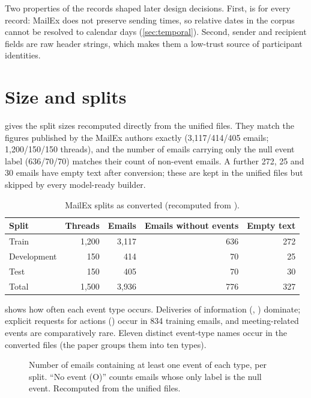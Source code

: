 Two properties of the records shaped later design decisions. First,  is  for every record: MailEx does not preserve sending times, so relative dates in the corpus cannot be resolved to calendar days (\cref{sec:temporal}). Second, sender and recipient fields are raw header strings, which makes them a low-trust source of participant identities.

\section{Size and splits}
 gives the split sizes recomputed directly from the unified files. They match the figures published by the MailEx authors exactly (3,117/414/405 emails; 1,200/150/150 threads), and the number of emails carrying only the null event label  (636/70/70) matches their count of non-event emails. A further 272, 25 and 30 emails have empty text after conversion; these are kept in the unified files but skipped by every model-ready builder.

\begin{table}[h]
\centering
\caption{MailEx splits as converted (recomputed from ).}
\label{tab:mailexsplits}
\small
\begin{tabular}{@{}lrrrr@{}}
\toprule
Split & Threads & Emails & Emails without events & Empty text \\
\midrule
Train & 1,200 & 3,117 & 636 & 272 \\
Development & 150 & 414 & 70 & 25 \\
Test & 150 & 405 & 70 & 30 \\
\midrule
Total & 1,500 & 3,936 & 776 & 327 \\
\bottomrule
\end{tabular}
\end{table}

 shows how often each event type occurs. Deliveries of information (, ) dominate; explicit requests for actions () occur in 834 training emails, and meeting-related events are comparatively rare. Eleven distinct event-type names occur in the converted files (the paper groups them into ten types).

\begin{figure}[t]
\centering
{}
\caption[MailEx event types by split]{Number of emails containing at least one event of each type, per split. ``No event (O)'' counts emails whose only label is the null event. Recomputed from the unified files.}
\label{fig:eventtypes}
\end{figure}

